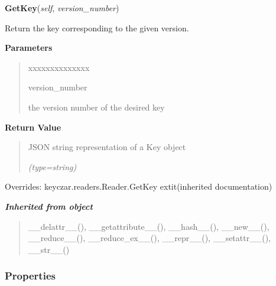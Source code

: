 \hspace{.8\funcindent}\begin{boxedminipage}{\funcwidth}

    \raggedright \textbf{GetKey}(\textit{self}, \textit{version\_number})

\setlength{\parskip}{2ex}
    Return the key corresponding to the given version.

\setlength{\parskip}{1ex}
      \textbf{Parameters}
      \vspace{-1ex}

      \begin{quote}
        \begin{Ventry}{xxxxxxxxxxxxxx}

          \item[version\_number]

          the version number of the desired key

        \end{Ventry}

      \end{quote}

      \textbf{Return Value}
    \vspace{-1ex}

      \begin{quote}
      JSON string representation of a Key object

      {\it (type=string)}

      \end{quote}

      Overrides: keyczar.readers.Reader.GetKey 	extit{(inherited documentation)}

    \end{boxedminipage}


\large{\textbf{\textit{Inherited from object}}}

\begin{quote}
\_\_delattr\_\_(), \_\_getattribute\_\_(), \_\_hash\_\_(), \_\_new\_\_(), \_\_reduce\_\_(), \_\_reduce\_ex\_\_(), \_\_repr\_\_(), \_\_setattr\_\_(), \_\_str\_\_()
\end{quote}


  \subsubsection{Properties}

